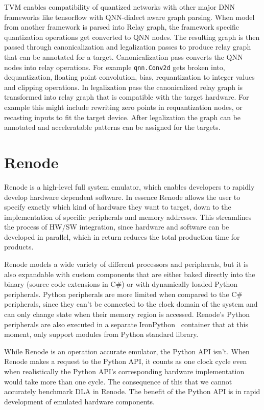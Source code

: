 \documentclass[12pt,a4paper,english
]{tunithesis}
\begin{document}
TVM enables compatibility of quantized networks with other major DNN frameworks like tensorflow with QNN-dialect aware graph parsing. When model from another framework is parsed into Relay graph, the framework specific quantization operations get converted to QNN nodes. The resulting graph is then passed through canonicalization and legalization passes to produce relay graph that can be annotated for a target.
Canonicalization pass converts the QNN nodes into relay operations. For example \texttt{qnn.Conv2d} gets broken into, dequantization, floating point convolution, bias, requantization to integer values and clipping operations.
In legalization pass the canonicalized relay graph is transformed into relay graph that is compatible with the target hardware. For example this might include rewriting zero points in requantization nodes, or recasting inputs to fit the target device.
After legalization the graph can be annotated and acceleratable patterns can be assigned for the targets.

\section{Renode}
\label{sec:renode}
Renode is a high-level full system emulator, which enables developers to rapidly develop hardware dependent software. In essence Renode allows the user to specify exactly which kind of hardware they want to target, down to the implementation of specific peripherals and memory addresses. This streamlines the process of HW/SW integration, since hardware and software can be developed in parallel, which in return reduces the total production time for products.

Renode models a wide variety of different processors and peripherals, but it is also expandable with custom components that are either baked directly into the binary (source code extensions in C\#) or with dynamically loaded Python peripherals. Python peripherals are more limited when compared to the C\# peripherals, since they can't be connected to the clock domain of the system and can only change state when their memory region is accessed. Renode's Python peripherals are also executed in a separate IronPython~\cite{ironpython} container that at this moment, only support modules from Python standard library.

While Renode is an operation accurate emulator, the Python API isn't. When Renode makes a request to the Python API, it counts as one clock cycle even when realistically the Python API's corresponding hardware implementation would take more than one cycle. The consequence of this that we cannot accurately benchmark DLA in Renode. The benefit of the Python API is in rapid development of emulated hardware components.
\end{document}
